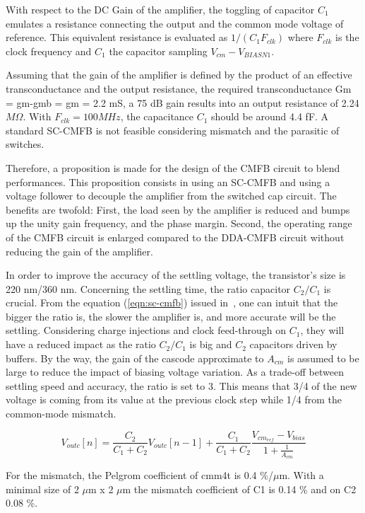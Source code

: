 With respect to the DC Gain of the amplifier, the toggling of capacitor \(C_1 \) emulates a resistance connecting the output and the common mode voltage of reference. This equivalent resistance is evaluated as \(1/(C_1 F_{clk}) \) where \(F_{clk} \) is the clock frequency and \(C_1 \) the capacitor sampling \(V_{cm}-V_{BIASN1}\).

Assuming that the gain of the amplifier is defined by the product of an effective transconductance and the output resistance, the required transconductance Gm = gm-gmb = gm = 2.2 mS, a 75 dB gain results into an output resistance of 2.24 \(M\Omega \). With \(F_{clk} = 100 MHz \), the capacitance \(C_1 \) should be around 4.4 fF. A standard SC-CMFB is not feasible considering mismatch and the parasitic of switches.

Therefore, a proposition is made for the design of the CMFB circuit to blend performances. This proposition consists in using an SC-CMFB and using a voltage follower to decouple the amplifier from the switched cap circuit.
The benefits are twofold: First, the load seen by the amplifier is reduced and bumps up the unity gain frequency, and the phase margin. Second, the operating range of the CMFB circuit is enlarged compared to the DDA-CMFB circuit without reducing the gain of the amplifier.

In order to improve the accuracy of the settling voltage, the transistor's size is 220 nm/360 nm. Concerning the settling time, the ratio capacitor \(C_2/C_1 \) is crucial. From the equation (\ref{eqn:sc-cmfb}) issued in~\cite{Choksi2003}, one can intuit that the bigger the ratio is, the slower the amplifier is, and more accurate will be the settling. Considering charge injections and clock feed-through on \(C_1\), they will have a reduced impact as the ratio \(C_2/C_1\) is big and \(C_2\) capacitors driven by buffers. By the way, the gain of the cascode approximate to \(A_{cm} \) is assumed to be large to reduce the impact of biasing voltage variation. As a trade-off between settling speed and accuracy, the ratio is set to 3. This means that 3/4 of the new voltage is coming from its value at the previous clock step while 1/4 from the common-mode mismatch.

\begin{equation}
    \label{eqn:sc-cmfb}
V_{outc}[n] = \frac{C_2}{C_1+C_2} V_{outc}[n-1] + \frac{C_1}{C_1+C_2} \frac{V_{cm_{ref}}-V_{bias}}{1+\frac{1}{A_{cm}}}
\end{equation}

For the mismatch, the Pelgrom coefficient of cmm4t is 0.4 \%/\(\mu \)m. With a minimal size of 2 \(\mu \)m x 2 \(\mu \)m the mismatch coefficient of C1 is 0.14 \% and on C2 0.08 \%.

